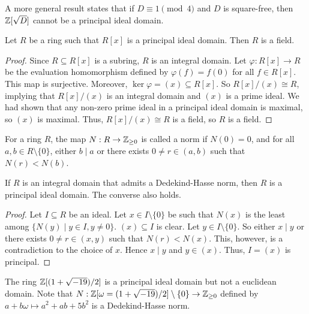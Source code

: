 A more general result states that if $D \equiv 1 \pmod{4}$ and $D$ is square-free, then $\mathbb{Z}[\sqrt{D}]$ cannot be a principal ideal domain.


\begin{proposition}
    Let $R$ be a ring such that $R[x]$ is a principal ideal domain. Then $R$ is a field.
\end{proposition}
\begin{proof}
    Since $R \subseteq R[x]$ is a subring, $R$ is an integral domain. Let $\varphi:R[x] \to R$ be the evaluation homomorphism defined by $\varphi(f) = f(0)$ for all $f \in R[x]$. This map is surjective. Moreover, $\ker \varphi = (x) \subseteq R[x]$. So $R[x]/(x) \cong R$, implying that $R[x]/(x)$ is an integral domain and $(x)$ is a prime ideal. We had shown that any non-zero prime ideal in a principal ideal domain is maximal, so $(x)$ is maximal. Thus, $R[x]/(x) \cong R$ is a field, so $R$ is a field.
\end{proof}
\begin{definition}
    For a ring $R$, the map $N:R \to \mathbb{Z}_{\geq 0}$ is called a  norm if $N(0) = 0$, and for all $a,b \in R \setminus \{0\}$, either $b \mid a$ or there exists $0 \neq r \in (a,b)$ such that $N(r) < N(b)$.
\end{definition}

\begin{proposition}
    If $R$ is an integral domain that admits a Dedekind-Hasse norm, then $R$ is a principal ideal domain. The converse also holds.
\end{proposition}

\begin{proof}
    Let $I \subseteq R$ be an ideal. Let $x \in I\setminus\{0\}$ be such that $N(x)$ is the least among $\{N(y) \mid y \in I, y \neq 0\}$. $(x) \subseteq I$ is clear. Let $y \in I\setminus\{0\}$. So either $x \mid y$ or there exists $0 \neq r \in (x,y)$ such that $N(r) < N(x)$. This, however, is a contradiction to the choice of $x$. Hence $x \mid y$ and $y \in (x)$. Thus, $I = (x)$ is principal. 
\end{proof}


\begin{example}
    The ring $\mathbb{Z}[(1+\sqrt{-19})/2]$ is a principal ideal domain but not a euclidean domain. Note that $N:\mathbb{Z}[\omega=(1+\sqrt{-19})/2]\setminus\{0\} \to \mathbb{Z}_{\geq 0}$ defined by $a+b\omega \mapsto a^{2}+ab+5b^{2}$ is a Dedekind-Hasse norm.
\end{example}

